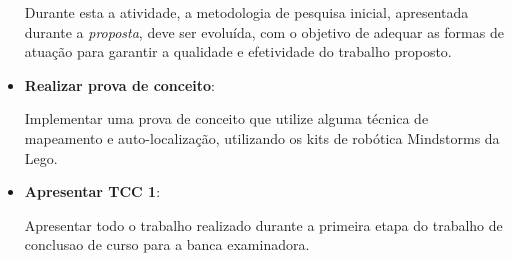 \begin{itemize}
		Durante esta a atividade, a metodologia de pesquisa inicial, apresentada durante a \textit{proposta}, deve ser evoluída, com o objetivo de adequar as formas de atuação para garantir a qualidade e efetividade do trabalho proposto. 

	\item \textbf{Realizar prova de conceito}:

		Implementar uma prova de conceito que utilize alguma técnica de mapeamento e auto-localização, utilizando os kits de robótica Mindstorms da Lego.

	\item \textbf{Apresentar TCC 1}:

		Apresentar todo o trabalho realizado durante a primeira etapa do trabalho de conclusao de curso para a banca examinadora.
\end{itemize}
